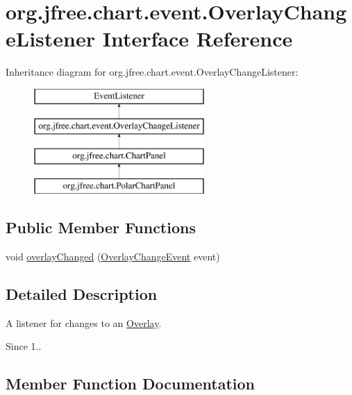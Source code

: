 \hypertarget{interfaceorg_1_1jfree_1_1chart_1_1event_1_1_overlay_change_listener}{}\section{org.\+jfree.\+chart.\+event.\+Overlay\+Change\+Listener Interface Reference}
\label{interfaceorg_1_1jfree_1_1chart_1_1event_1_1_overlay_change_listener}
Inheritance diagram for org.\+jfree.\+chart.\+event.\+Overlay\+Change\+Listener\+:\begin{figure}[H]
\begin{center}
\leavevmode
\includegraphics[height=4.000000cm]{interfaceorg_1_1jfree_1_1chart_1_1event_1_1_overlay_change_listener}
\end{center}
\end{figure}
\subsection*{Public Member Functions}
\begin{DoxyCompactItemize}
\item 
void \mbox{\hyperlink{interfaceorg_1_1jfree_1_1chart_1_1event_1_1_overlay_change_listener_abadcf94b887953665dc22734823cc413}{overlay\+Changed}} (\mbox{\hyperlink{classorg_1_1jfree_1_1chart_1_1event_1_1_overlay_change_event}{Overlay\+Change\+Event}} event)
\end{DoxyCompactItemize}


\subsection{Detailed Description}
A listener for changes to an \mbox{\hyperlink{}{Overlay}}.

\begin{DoxySince}{Since}
1.. 
\end{DoxySince}


\subsection{Member Function Documentation}
\mbox{\label{interfaceorg_1_1jfree_1_1chart_1_1event_1_1_overlay_change_listener_abadcf94b887953665dc22734823cc413}} 

